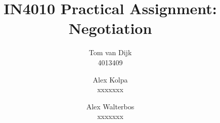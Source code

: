 \title{IN4010 Practical Assignment: Negotiation}
\author{Tom van Dijk \\ 4013409 \and
Alex Kolpa \\ xxxxxxx \and
Alex Walterbos \\ xxxxxxx}
\date{}